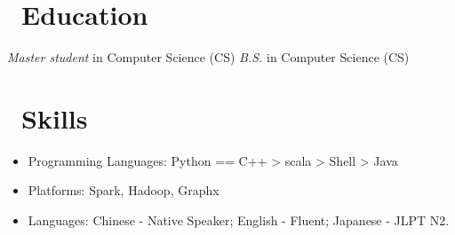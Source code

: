 \documentclass{resume}
\begin{document}



\section{\faGraduationCap\ Education}
\textit{Master student} in Computer Science (CS)
\textit{B.S.} in Computer Science (CS)

\section{\faCogs\ Skills}
\begin{itemize}[parsep=0.5ex]
  \item Programming Languages:  Python == C++ > scala > Shell > Java
  \item Platforms: Spark, Hadoop, Graphx
  \item Languages: Chinese - Native Speaker; English - Fluent; Japanese - JLPT N2.
\end{itemize}
\end{document}
